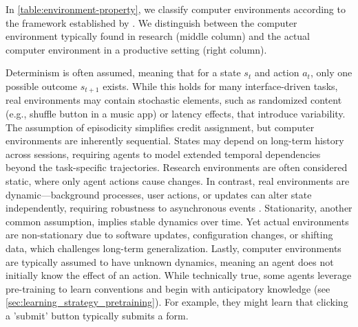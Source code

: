 In \cref{table:environment-property}, we classify computer environments according to the framework established by \citet[Chapter~2.3]{russell_artificial_2022}.
We distinguish between the computer environment typically found in research (middle column) and the actual computer environment in a productive setting (right column).

Determinism is often assumed, meaning that for a state $s_t$ and action $a_t$, only one possible outcome $s_{t+1}$ exists. 
While this holds for many interface-driven tasks, real environments may contain stochastic elements, such as randomized content (e.g., shuffle button in a music app) or latency effects, that introduce variability.
% 
The assumption of episodicity simplifies credit assignment, but computer environments are inherently sequential. States may depend on long-term history across sessions, requiring agents to model extended temporal dependencies beyond the task-specific trajectories.
% 
Research environments are often considered static, where only agent actions cause changes. In contrast, real environments are dynamic—background processes, user actions, or updates can alter state independently, requiring robustness to asynchronous events \citep{humble_continuous_2011}.
% 
Stationarity, another common assumption, implies stable dynamics over time. Yet actual environments are non-stationary due to software updates, configuration changes, or shifting data, which challenges long-term generalization.
% 
Lastly, computer environments are typically assumed to have unknown dynamics, meaning an agent does not initially know the effect of an action. While technically true, some agents leverage pre-training to learn conventions and begin with anticipatory knowledge (see \cref{sec:learning_strategy_pretraining}). For example, they might learn that clicking a 'submit' button typically submits a form.